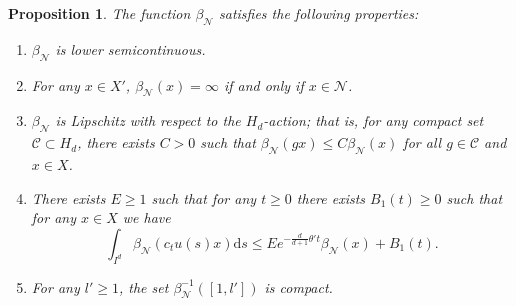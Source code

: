 \documentclass[12pt,reqno]{amsart}
\numberwithin{equation}{section}
\theoremstyle{plain}
\newtheorem{prop}[thm]{Proposition}
\theoremstyle{definition}
\theoremstyle{remark}
\newcommand\cC{\mathcal{C}}
\newcommand\cN{\mathcal{N}}
\newcommand{\de}{\mathrm{d}}
\newcommand{\bN}{\beta_\cN}
\begin{document}
	\begin{prop} \label{prop:properties of beta}
	    The function $\bN$ satisfies the following properties:
        \begin{enumerate}
            \item  \label{itm:bN-lowersemi} $\bN$ is lower semicontinuous.
            \item \label{itm:bN-infty} For any $x\in X'$, $\bN(x)=\infty$ if and only if $x\in\cN$.
            \item \label{itm:bN-Hd-Lip} $\bN$ is Lipschitz with respect to the $H_d$-action; that is, for any compact set $\cC\subset H_d$, there exists $C>0$ such that $\bN(g x)\leq C\bN(x)$ for all $g\in \cC$ and $x\in X$.
           
            
            \item \label{itm:bN-contract} There exists $E\geq1$ such that for any $t\geq 0$ there exists $B_1(t)\geq 0$ such that for any $x\in X$ we have
                \begin{equation}\label{eq:contraction_beta}
		              \int_{I^d}\bN(c_{t}u(s)x)\de s \leq Ee^{-\frac{d}{d+1}\theta't}\bN(x)+B_1(t).
                \end{equation}

        \item \label{itm:bN-proper} For any $l'\geq 1$, the set $\bN^{-1}([1,l'])$ is compact. 
        \end{enumerate}
        
	\end{prop}
\end{document}
